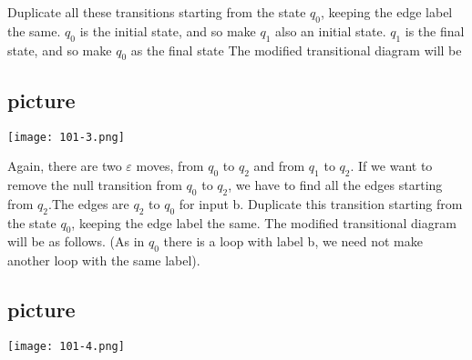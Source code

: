 \documentclass[8pt]{beamer}
\begin{document}
\begin{frame}
\hspace*{0.5cm} Duplicate all these transitions starting from the state $q_0$, keeping the edge label the same. $q_0$ is
the initial state, and so make $q_1$ also an initial state. $q_1$ is the final state, and so make $q_0$ as the final
state The modified transitional diagram will be\\

\vspace*{0.3cm}
\begin{center}
\section{picture}
\texttt{[image: 101-3.png]}
\end{center}

\vspace*{0.3cm}
\end{frame}

\begin{frame}
Again, there are two $\varepsilon$ moves, from $q_0$ to $q_2$ and from $q_1$ to $q_2$. If we want to remove the null transition
from $q_0$ to $q_2$, we have to find all the edges starting from $q_2$.The edges are $q_2$ to $q_0$ for input b.
Duplicate this transition starting from the state $q_0$, keeping the edge label the same. The modified
transitional diagram will be as follows. (As in $q_0$ there is a loop with label b, we need not make
another loop with the same label).\\

\vspace*{0.2cm}
\begin{center}
\section{picture}
\texttt{[image: 101-4.png]}
\end{center}
\end{frame}
\end{document}

